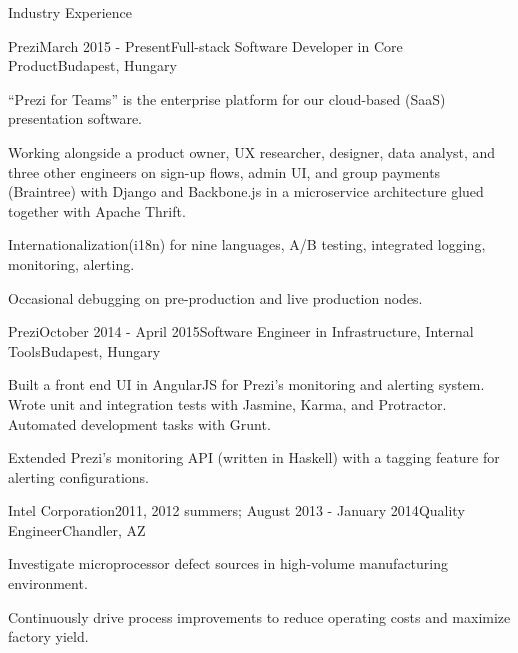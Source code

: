 \documentclass{resume} %
\begin{document}
\begin{rSection}{Industry Experience}

\begin{rSubsection}{Prezi}{March 2015 - Present}{Full-stack Software Developer in Core Product}{Budapest, Hungary}
\item ``Prezi for Teams'' is the enterprise platform for our cloud-based (SaaS) presentation software.
\item Working alongside a product owner, UX researcher, designer, data analyst, and three other engineers on sign-up flows, admin UI, and group payments (Braintree) with Django and Backbone.js in a microservice architecture glued together with Apache Thrift.
\item Internationalization(i18n) for nine languages, A/B testing, integrated logging, monitoring, alerting.
\item Occasional debugging on pre-production and live production nodes.
\end{rSubsection}


\begin{rSubsection}{Prezi}{October 2014 - April 2015}{Software Engineer in Infrastructure, Internal Tools}{Budapest, Hungary}
\item Built a front end UI in AngularJS for Prezi's monitoring and alerting system. Wrote unit and integration tests with Jasmine, Karma, and Protractor. Automated development tasks with Grunt.
\item Extended Prezi's monitoring API (written in Haskell) with a tagging feature for alerting configurations.
\end{rSubsection}


\begin{rSubsection}{Intel Corporation}{2011, 2012 summers; August 2013 - January 2014}{Quality Engineer}{Chandler, AZ}
\item Investigate microprocessor defect sources in high-volume manufacturing environment. 
\item Continuously drive process improvements to reduce operating costs and maximize factory yield.
\end{rSubsection}

\end{rSection}
\end{document}
